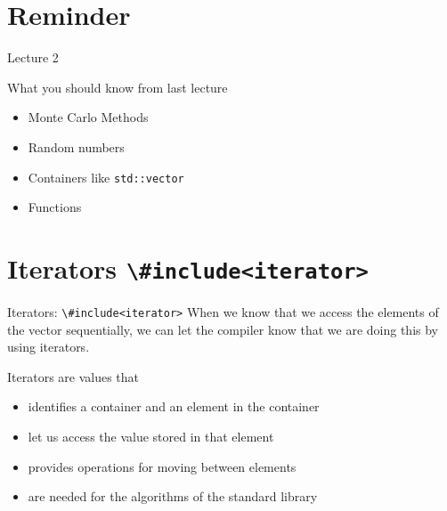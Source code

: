 \documentclass[\classoption]{beamer}
\title{\coursename}
\subtitle{Lecture 3: Iterators, Lists, and using library algorithms}
\author{\tiny Patrick Diehl \orcid{0000-0003-3922-8419}}
\date {
 \tiny \url{\courseurl}
\vspace{2cm}
\doclicenseThis  
  
}
\begin{document}
 {
    \frame {
        \titlepage
    }
}

\frame{

\tableofcontents

}


\section{Reminder}

\begin{frame}{Lecture 2}
\begin{block}{What you should know from last lecture}
\begin{itemize}
\item Monte Carlo Methods
\item Random numbers
\item Containers like \lstinline|std::vector|
\item Functions
\end{itemize}
\end{block}
\end{frame}

\section{Iterators \lstinline|\#include<iterator>|}

\begin{frame}{Iterators: \lstinline|\#include<iterator>|}
When we know that we access the elements of the vector sequentially, we can let the compiler know that we are doing this by using iterators.
\vspace{1cm}
\begin{block}{Iterators are values that}
\begin{itemize}
\item identifies a container and an element in the container
\item let us access the value stored in that element
\item provides operations for moving between elements
\item are needed for the algorithms of the standard library
\end{itemize}
\end{block}


\end{frame}
\end{document}
